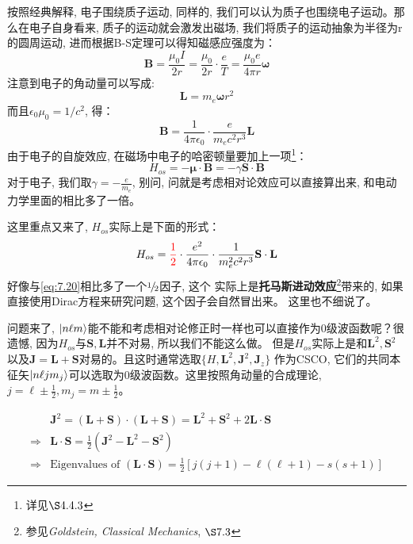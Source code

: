 \documentclass[a4paper,zihao=-4,linespread=1]{ctexrep}
\begin{document}
    按照经典解释, 电子围绕质子运动, 同样的, 我们可以认为质子也围绕电子运动。那么在电子自身看来, 质子的运动就会激发出磁场, 我们将质子的运动抽象为半径为r的圆周运动,
    进而根据B-S定理可以得知磁感应强度为：
    \begin{equation}
        \mathbf{B}=\frac{\mu_0I}{2r}=\frac{\mu_0}{2r}\cdot\frac{e}{T}=\frac{\mu_0e}{4\pi r}\mathbf{\omega}
    \end{equation}
    注意到电子的角动量可以写成:
    \[\mathbf{L}=m_e\mathbf{\omega}r^2\]
    而且$\epsilon_0\mu_0=1/c^2$, 得：
    \begin{equation}
        \mathbf{B}=\frac{1}{4\pi\epsilon_0}\cdot\frac{e}{m_ec^2r^3}\mathbf{L}
    \end{equation}
    由于电子的自旋效应, 在磁场中电子的哈密顿量要加上一项\footnote{详见$\S4.4.3$}：
    \begin{equation}
        \label{eq:7.20}
        H_{os}=-\mathbf{\mu}\cdot\mathbf{B}=-\gamma \mathbf{S}\cdot\mathbf{B}
    \end{equation}
    对于电子, 我们取$\gamma=-\frac{e}{m_e}$, 别问, 问就是考虑相对论效应可以直接算出来, 和电动力学里面的相比多了一倍。

    这里重点又来了, $H_{os}$实际上是下面的形式：
    \begin{equation}
        H_{os}={\color{red} \frac{1}{2}}\cdot\frac{e^2}{4\pi\epsilon_0}\cdot\frac{1}{m_e^2c^2r^3}\mathbf{S}\cdot\mathbf{L}
    \end{equation}
    好像与\ref{eq:7.20}相比多了一个${\raise0.5ex\hbox{$\scriptstyle 1$}\kern-0.1em/\kern-0.15em\lower0.25ex\hbox{$\scriptstyle 2$}}$因子, 这个
    实际上是\textbf{托马斯进动效应}\footnote{参见{\itshape Goldstein, Classical Mechanics}, $\S7.3$}带来的, 如果直接使用Dirac方程来研究问题, 这个因子会自然冒出来。
    这里也不细说了。

    问题来了, $\ket{n\ell m}$能不能和考虑相对论修正时一样也可以直接作为0级波函数呢？很遗憾, 因为$H_{os}$与$\mathbf{S},\mathbf{L}$并不对易, 所以我们不能这么做。
    但是$H_{os}$实际上是和$\mathbf{L}^2,\mathbf{S}^2$以及$\mathbf{J}=\mathbf{L}+\mathbf{S}$对易的。且这时通常选取$\{H,\mathbf{L}^2,\mathbf{J}^2,\mathbf{J}_z\}$
    作为CSCO, 它们的共同本征矢$\ket{n\ell j m_j}$可以选取为0级波函数。这里按照角动量的合成理论, $j=\ell\pm\frac{1}{2}, m_j=m\pm\frac{1}{2}$。

    \begin{align*}
        &\mathbf{J}^2=\left(\mathbf{L}+\mathbf{S}\right)\cdot\left(\mathbf{L}+\mathbf{S}\right)=\mathbf{L}^2+\mathbf{S}^2+2\mathbf{L}\cdot\mathbf{S}\\
        \Rightarrow&\mathbf{L}\cdot\mathbf{S}=\frac{1}{2}\left(\mathbf{J}^2-\mathbf{L}^2-\mathbf{S}^2\right)\\
        \Rightarrow&\text{Eigenvalues of }\left(\mathbf{L}\cdot\mathbf{S}\right)=\frac{1}{2}\left[j(j+1)-\ell(\ell+1)-s(s+1)\right]
    \end{align*}
\end{document}
